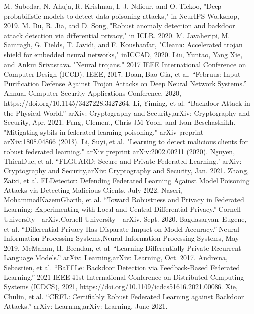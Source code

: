 \documentclass[conference]{IEEEtran}
\begin{document}
\begin{thebibliography}{00}
     M. Subedar, N. Ahuja, R. Krishnan, I. J. Ndiour, and O. Tickoo, "Deep probabilistic models to detect data poisoning attacks," in NeurIPS Workshop, 2019.
     M. Du, R. Jia, and D. Song, "Robust anomaly detection and backdoor attack detection via differential privacy," in ICLR, 2020.
     M. Javaheripi, M. Samragh, G. Fields, T. Javidi, and F. Koushanfar, "Cleann: Accelerated trojan shield for embedded neural networks," inICCAD, 2020.
     Liu, Yuntao, Yang Xie, and Ankur Srivastava. "Neural trojans." 2017 IEEE International Conference on Computer Design (ICCD). IEEE, 2017.
     Doan, Bao Gia, et al. “Februus: Input Purification Defense Against Trojan Attacks on Deep Neural Network Systems.” Annual Computer Security Applications Conference, 2020, https://doi.org/10.1145/3427228.3427264.
     Li, Yiming, et al. “Backdoor Attack in the Physical World.” arXiv: Cryptography and Security,arXiv: Cryptography and Security, Apr. 2021.
     Fung, Clement, Chris JM Yoon, and Ivan Beschastnikh. "Mitigating sybils in federated learning poisoning." arXiv preprint arXiv:1808.04866 (2018).
     Li, Suyi, et al. "Learning to detect malicious clients for robust federated learning." arXiv preprint arXiv:2002.00211 (2020).
     Nguyen, ThienDuc, et al. “FLGUARD: Secure and Private Federated Learning.” arXiv: Cryptography and Security,arXiv: Cryptography and Security, Jan. 2021.
     Zhang, Zaixi, et al. FLDetector: Defending Federated Learning Against Model Poisoning Attacks via Detecting Malicious Clients. July 2022.
     Naseri, MohammadKazemGharib, et al. “Toward Robustness and Privacy in Federated Learning: Experimenting with Local and Central Differential Privacy.” Cornell University - arXiv,Cornell University - arXiv, Sept. 2020.
     Bagdasaryan, Eugene, et al. “Differential Privacy Has Disparate Impact on Model Accuracy.” Neural Information Processing Systems,Neural Information Processing Systems, May 2019.
     McMahan, H. Brendan, et al. “Learning Differentially Private Recurrent Language Models.” arXiv: Learning,arXiv: Learning, Oct. 2017.
     Andreina, Sebastien, et al. “BaFFLe: Backdoor Detection via Feedback-Based Federated Learning.” 2021 IEEE 41st International Conference on Distributed Computing Systems (ICDCS), 2021, https://doi.org/10.1109/icdcs51616.2021.00086.
     Xie, Chulin, et al. “CRFL: Certifiably Robust Federated Learning against Backdoor Attacks.” arXiv: Learning,arXiv: Learning, June 2021.

\end{thebibliography}
\end{document}
